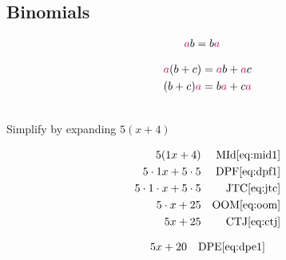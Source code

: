 \subsection*{Binomials}

\begin{definition}

\begin{align}
\alert{a}b &= b\alert{a} \label{eq:cpa} 
\end{align}
\end{definition}

\begin{definition}
\begin{subequations}
\begin{align}
\alert{a}(b+c) &= \alert{a}b + \alert{a}c \label{eq:dpe1} \\
 (b+c)\alert{a} &= b\alert{a} + c\alert{a}  \label{eq:dpe2}
\end{align}
\end{subequations}
\end{definition}

\begin{example}[id:20141109-090809] \label{20141109-090809}  \hfill \\

Simplify by expanding $5(x+4)$

\soln

\solnsteps
\begin{align*}
5(1x+4) && \text{MId} \eqref{eq:mid1} \\ 
5 \cdot 1x + 5 \cdot 5 && \text{DPF} \eqref{eq:dpf1} \\ 
5 \cdot 1 \cdot x + 5 \cdot 5 && \text{JTC} \eqref{eq:jtc} \\
5 \cdot x + 25  && \text{OOM} \eqref{eq:oom} \\
5x + 25  && \text{CTJ} \eqref{eq:ctj} 
\end{align*}

\soln

\lesssteps
\begin{align*}
5x + 20 && \text{DPE} \eqref{eq:dpe1} 
\end{align*}

\end{example}

